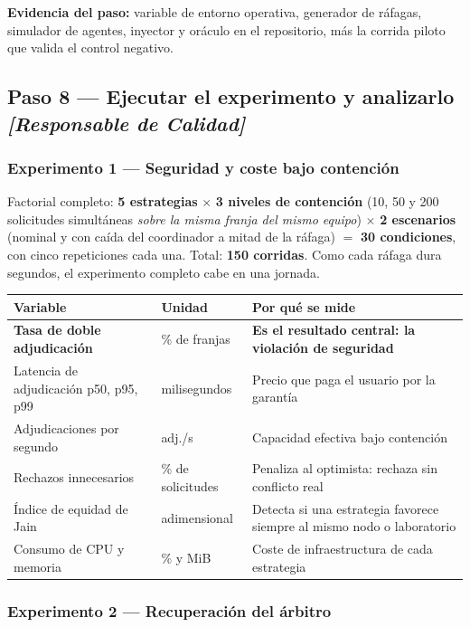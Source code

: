 \documentclass[11pt,a4paper]{article}
\newcommand{\paso}[1]{\subsection{#1}}
\begin{document}
	\textbf{Evidencia del paso:} variable de entorno operativa, generador de ráfagas, simulador de agentes, inyector y oráculo en el repositorio, más la corrida piloto que valida el control negativo.
	
	\paso{Paso 8 --- Ejecutar el experimento y analizarlo \emph{[Responsable de Calidad]}}
	
	\subsubsection{Experimento 1 --- Seguridad y coste bajo contención}
	
	Factorial completo: \textbf{5 estrategias} $\times$ \textbf{3 niveles de contención} (10, 50 y 200 solicitudes simultáneas \emph{sobre la misma franja del mismo equipo}) $\times$ \textbf{2 escenarios} (nominal y con caída del coordinador a mitad de la ráfaga) $=$ \textbf{30 condiciones}, con cinco repeticiones cada una. Total: \textbf{150 corridas}. Como cada ráfaga dura segundos, el experimento completo cabe en una jornada.
	
	\begin{center}
		\small
		\begin{tabular}{@{}p{5.2cm}p{3.2cm}p{6.2cm}@{}}
			\toprule
			\textbf{Variable} & \textbf{Unidad} & \textbf{Por qué se mide} \\
			\midrule
			\textbf{Tasa de doble adjudicación} & \% de franjas & \textbf{Es el resultado central: la violación de seguridad} \\
			Latencia de adjudicación p50, p95, p99 & milisegundos & Precio que paga el usuario por la garantía \\
			Adjudicaciones por segundo & adj./s & Capacidad efectiva bajo contención \\
			Rechazos innecesarios & \% de solicitudes & Penaliza al optimista: rechaza sin conflicto real \\
			Índice de equidad de Jain & adimensional & Detecta si una estrategia favorece siempre al mismo nodo o laboratorio \\
			Consumo de CPU y memoria & \% y MiB & Coste de infraestructura de cada estrategia \\
			\bottomrule
		\end{tabular}
	\end{center}
	
	\subsubsection{Experimento 2 --- Recuperación del árbitro}
	
\end{document}
